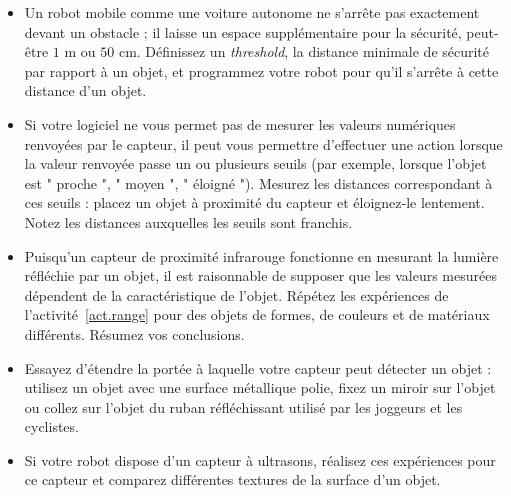 \medskip

\begin{framed}

\begin{itemize}
\item Un robot mobile comme une voiture autonome ne s'arrête pas exactement devant un obstacle ; il laisse un espace supplémentaire pour la sécurité, peut-être $1$ m ou $50$ cm. Définissez un \emph{threshold}, la distance minimale de sécurité par rapport à un objet, et programmez votre robot pour qu'il s'arrête à cette distance d'un objet.
\item Si votre logiciel ne vous permet pas de mesurer les valeurs numériques renvoyées par le capteur, il peut vous permettre d'effectuer une action lorsque la valeur renvoyée passe un ou plusieurs seuils (par exemple, lorsque l'objet est " proche ", " moyen ", " éloigné "). Mesurez les distances correspondant à ces seuils : placez un objet à proximité du capteur et éloignez-le lentement. Notez les distances auxquelles les seuils sont franchis.
\end{itemize}
\end{framed}

\begin{framed}

\begin{itemize}
\item Puisqu'un capteur de proximité infrarouge fonctionne en mesurant la lumière réfléchie par un objet, il est raisonnable de supposer que les valeurs mesurées dépendent de la caractéristique de l'objet. Répétez les expériences de l'activité~\ref{act.range} pour des objets de formes, de couleurs et de matériaux différents. Résumez vos conclusions.
\item Essayez d'étendre la portée à laquelle votre capteur peut détecter un objet : utilisez un objet avec une surface métallique polie, fixez un miroir sur l'objet ou collez sur l'objet du ruban réfléchissant utilisé par les joggeurs et les cyclistes.
\item Si votre robot dispose d'un capteur à ultrasons, réalisez ces expériences pour ce capteur et comparez différentes textures de la surface d'un objet.
\end{itemize}
\end{framed}


